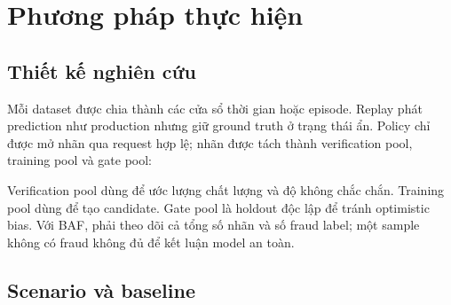 \section{Phương pháp thực hiện}

\subsection{Thiết kế nghiên cứu}

Mỗi dataset được chia thành các cửa sổ thời gian hoặc episode. Replay phát prediction như production nhưng giữ ground truth ở trạng thái ẩn. Policy chỉ được mở nhãn qua request hợp lệ; nhãn được tách thành verification pool, training pool và gate pool:

\begin{center}
\end{center}

Verification pool dùng để ước lượng chất lượng và độ không chắc chắn. Training pool dùng để tạo candidate. Gate pool là holdout độc lập để tránh optimistic bias. Với BAF, phải theo dõi cả tổng số nhãn và số fraud label; một sample không có fraud không đủ để kết luận model an toàn.

\subsection{Scenario và baseline}

